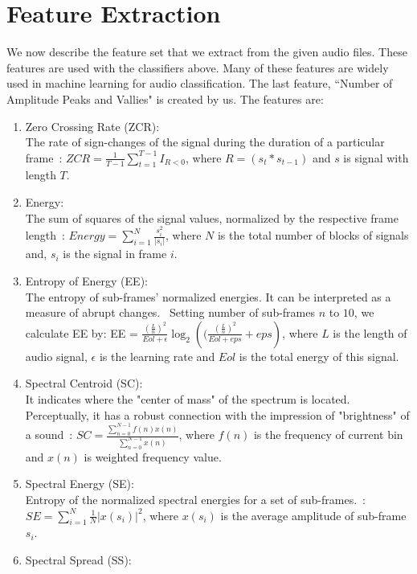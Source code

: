 \section{Feature Extraction}
We now describe the feature set that we extract from the given audio files. These features are used with the classifiers above. Many of these features are widely used in machine learning for audio classification. The last feature, ``Number of Amplitude Peaks and Vallies" is created by us. The features are:
\begin{enumerate}
	\item Zero Crossing Rate (ZCR):\\
	The rate of sign-changes of the signal during the duration of a particular frame~\cite{b1}: $ZCR=\frac{1}{T-1}\sum_{t = 1}^{T - 1}I_{R<0}$, where $R = (s_t * s_{t-1})$ and $s$ is signal with length $T$.
	\item Energy:\\
	The sum of squares of the signal values, normalized by the respective frame length~\cite{b2}: $Energy = \sum_{i = 1}^{N} \frac{s_i^2}{|s_i|} $, where $N$ is the total number of blocks of signals and, $s_i$ is the signal in frame $i$.
	\item Entropy of Energy (EE):\\
	The entropy of sub-frames' normalized energies. It can be interpreted as a measure of abrupt changes.~\cite{b2} Setting number of sub-frames $n$ to $10$, we calculate EE by: EE = $\frac{(\frac{L}{n})^2}{Eol +\epsilon} \log_{2}({(\frac{(\frac{L}{n})^2}{Eol +eps} + eps})$, where $L$ is the length of audio signal, $\epsilon$ is the learning rate and $Eol$ is the total energy of this signal.
	\item Spectral Centroid (SC):\\
	It indicates where the "center of mass" of the spectrum is located. Perceptually, it has a robust connection with the impression of "brightness" of a sound~\cite{b3}:  $SC = \frac{\sum_{n = 0}^{N - 1} f(n)x(n)}{\sum_{n = 0}^{N - 1} x(n)}$, where $f(n)$ is the frequency of current bin and $x(n)$ is weighted frequency value.
	\item Spectral Energy (SE):\\
	Entropy of the normalized spectral energies for a set of sub-frames.~\cite{b3}: $SE = \sum_{i = 1}^{N} \frac{1}{N} |x(s_i)|^2$, where $x(s_i)$ is the average amplitude of sub-frame $s_i$.\\
	\item Spectral Spread (SS):\\

\end{enumerate}
